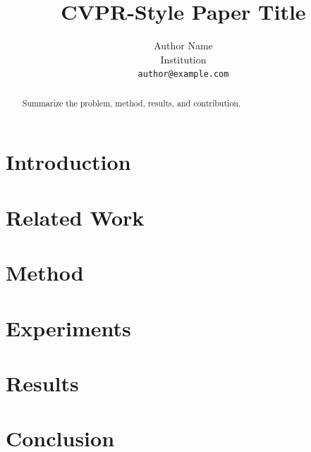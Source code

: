 \documentclass[10pt,twocolumn,letterpaper]{article}
\title{CVPR-Style Paper Title}
\author{Author Name\\Institution\\{\tt\small author@example.com}}
\begin{document}
\maketitle

\begin{abstract}
Summarize the problem, method, results, and contribution.
\end{abstract}

\section{Introduction}
\section{Related Work}
\section{Method}
\section{Experiments}
\section{Results}
\section{Conclusion}

% 
% 
\end{document}
